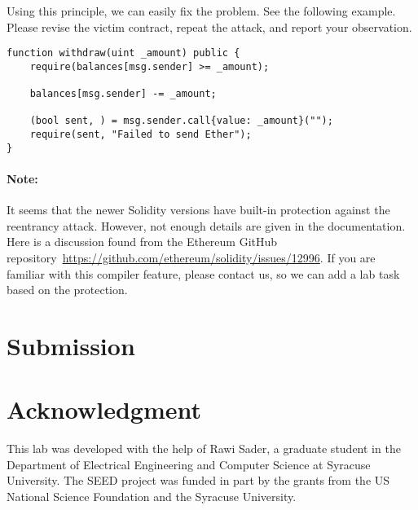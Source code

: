 Using this principle, we can easily fix the problem. See the following example. Please 
revise the victim contract, repeat the attack, and report your observation. 

\begin{lstlisting}[language=Solidity] 
function withdraw(uint _amount) public {
    require(balances[msg.sender] >= _amount);

    balances[msg.sender] -= _amount;

    (bool sent, ) = msg.sender.call{value: _amount}("");
    require(sent, "Failed to send Ether");
}
\end{lstlisting}


\paragraph{Note:} It seems that the newer Solidity versions have built-in
protection against the reentrancy attack. However, not enough details are 
given in the documentation. Here is a discussion
found from the Ethereum GitHub 
repository~\url{https://github.com/ethereum/solidity/issues/12996}.
If you are familiar with this compiler feature, please contact us, so 
we can add a lab task based on the protection.





\section{Submission}




\section*{Acknowledgment}

This lab was developed with the help of Rawi Sader,
a graduate student in the Department of Electrical Engineering
and Computer Science at Syracuse University.
The SEED project was funded in part
by the grants from the US National Science Foundation
and the Syracuse University.




